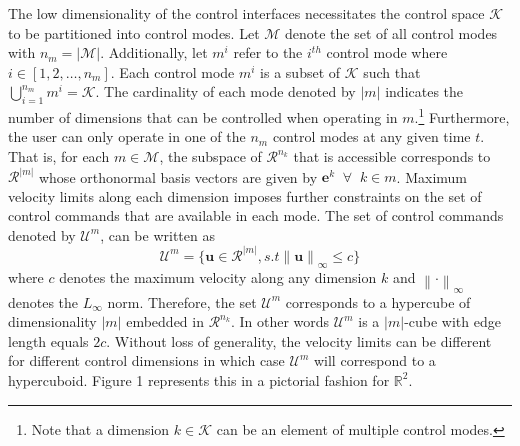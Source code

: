 \documentclass[conference]{IEEEtran}
\newcommand{\norm}[1]{\left\lVert#1\right\rVert}
\begin{document}
The low dimensionality of the control interfaces necessitates the control space $\mathcal{K}$ to be partitioned into control modes. Let $\mathcal{M}$ denote the set of all control modes with $n_m = \vert\mathcal{M}\vert$. Additionally, let $m^i$ refer to the $i^{th}$ control mode where $i \in [1,2,\dots,n_m]$. Each control mode $m^i$ is a subset of $\mathcal{K}$ such that $\bigcup\limits_{i=1}^{n_m} m^i = \mathcal{K}$. The cardinality of each mode denoted by $\vert m \vert$ indicates the number of dimensions that can be controlled when operating in $m$.\footnote{Note that a dimension $k \in \mathcal{K}$ can be an element of multiple control modes.} Furthermore, the user can only operate in one of the $n_m$ control modes at any given time $t$. That is, for each $m \in \mathcal{M}$, the subspace of $\mathcal{R}^{n_k}$ that is accessible corresponds to $\mathcal{R}^{\vert m \vert}$ whose orthonormal basis vectors are given by $\boldsymbol{e}^k \;\; \forall \;\; k \in m$. Maximum velocity limits along each dimension imposes further constraints on the set of control commands that are available in each mode. The set of control commands denoted by $\mathcal{U}^m$, can be written as 
\begin{equation*}
\mathcal{U}^m = \{\boldsymbol{u} \in \mathcal{R}^{\vert m \vert}, s.t \norm{\boldsymbol{u}}_{\infty} \leq c \} 
\end{equation*}
where $c$ denotes the maximum velocity along any dimension $k$ and $\norm{\cdot}_{\infty}$ denotes the $L_\infty$ norm. Therefore, the set $\mathcal{U}^m$ corresponds to a hypercube of dimensionality $\vert m \vert$ embedded in $\mathcal{R}^{n_k}$. In other words $\mathcal{U}^m$ is a $\vert m \vert$-cube with edge length equals $2c$. Without loss of generality, the velocity limits can be different for different control dimensions in which case $\mathcal{U}^m$ will correspond to a hypercuboid. Figure 1 represents this in a pictorial fashion for $\mathbb{R}^2$. 
\end{document}

